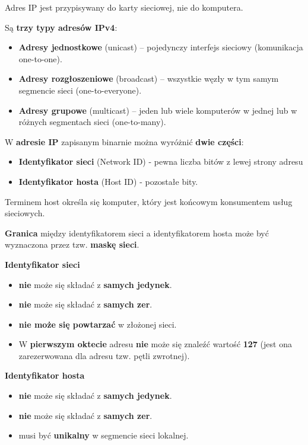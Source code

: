 \documentclass[../main.tex]{subfiles}
\begin{document}
    Adres IP jest przypisywany do karty sieciowej, nie do komputera.

    Są \textbf{trzy typy adresów IPv4}:
    \begin{itemize}
        \item \textbf{Adresy jednostkowe} (unicast) – pojedynczy interfejs sieciowy (komunikacja one-to-one).
        \item \textbf{Adresy rozgłoszeniowe} (broadcast) – wszystkie węzły w tym samym segmencie sieci (one-to-everyone).
        \item \textbf{Adresy grupowe} (multicast) – jeden lub wiele komputerów w jednej lub w różnych segmentach sieci (one-to-many).
    \end{itemize}

    W \textbf{adresie IP} zapisanym binarnie można wyróżnić \textbf{dwie części}:
    \begin{itemize}
        \item \textbf{Identyfikator sieci} (Network ID) - pewna liczba bitów z lewej strony adresu
        \item \textbf{Identyfikator hosta} (Host ID) - pozostałe bity.
    \end{itemize}
    Terminem host określa się komputer, który jest końcowym konsumentem usług sieciowych.

    \textbf{Granica} między identyfikatorem sieci a identyfikatorem hosta może być wyznaczona przez
    tzw. \textbf{maskę sieci}.

    \textbf{Identyfikator sieci}
    \begin{itemize}
        \item \textbf{nie} może się składać z \textbf{samych jedynek}.
        \item \textbf{nie} może się składać z \textbf{samych zer}.
        \item \textbf{nie może się powtarzać} w złożonej sieci.
        \item W \textbf{pierwszym oktecie} adresu \textbf{nie} może się znaleźć wartość \textbf{127} (jest ona zarezerwowana dla adresu tzw. pętli zwrotnej).
    \end{itemize}

    \textbf{Identyfikator hosta}
    \begin{itemize}
        \item \textbf{nie} może się składać z \textbf{samych jedynek}.
        \item \textbf{nie} może się składać z \textbf{samych zer}.
        \item musi być \textbf{unikalny} w segmencie sieci lokalnej.
    \end{itemize}
\end{document}
